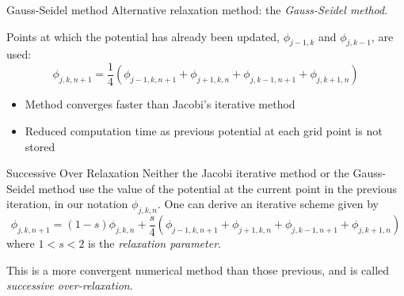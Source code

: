 \documentclass{beamer}
\newcommand{\be}{\begin{equation}}
\newcommand{\ee}{\end{equation}}
\begin{document}
\begin{frame}{Gauss-Seidel method}
Alternative relaxation method: the \emph{Gauss-Seidel method}. 

Points at which the potential has already been updated, $\phi_{j-1,k}$ and
$\phi_{j,k-1}$, are used:
%
\be
\phi_{j,k,n+1}= \frac{1}{4}(\phi_{j-1,k,n+1}+\phi_{j+1,k,n}+\phi_{j,k-1,n+1}+\phi_{j,k+1,n})
\ee

\begin{itemize}
\item Method converges faster than Jacobi's iterative method
\item Reduced computation time as previous potential at each grid point is not stored
\end{itemize}

\end{frame}

\begin{frame}{Successive Over Relaxation}
Neither the Jacobi iterative method or the Gauss-Seidel method use the value
of the potential at the current point in the previous iteration, in our notation
$\phi_{j,k,n}$.
One can derive an iterative scheme given by
%
\be
\phi_{j,k,n+1}= (1-s)\phi_{j,k,n}+\frac{s}{4}(\phi_{j-1,k,n+1}+\phi_{j+1,k,n}+\phi_{j,k-1,n+1}+\phi_{j,k+1,n})
\ee
%
where $1<s<2$ is the \emph{relaxation parameter}. 

This is a more convergent numerical method than those previous, and is called 
\emph{successive over-relaxation}.
\end{frame}
\end{document}
